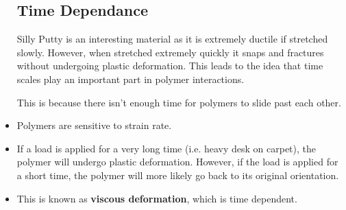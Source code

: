 \begin{itemize}
    \subsection{Time Dependance}
    \begin{case}
        Silly Putty is an interesting material as it is extremely ductile if stretched slowly. However, when stretched extremely quickly it snaps and fractures without undergoing plastic deformation. This leads to the idea that time scales play an important part in polymer interactions.
        \vspace{2mm}

        This is because there isn't enough time for polymers to slide past each other.
    \end{case}
    \item Polymers are sensitive to strain rate.
    \item If a load is applied for a very long time (i.e. heavy desk on carpet), the polymer will undergo plastic deformation. However, if the load is applied for a short time, the polymer will more likely go back to its original orientation.
    \item This is known as \textbf{viscous deformation}, which is time dependent.
\end{itemize}